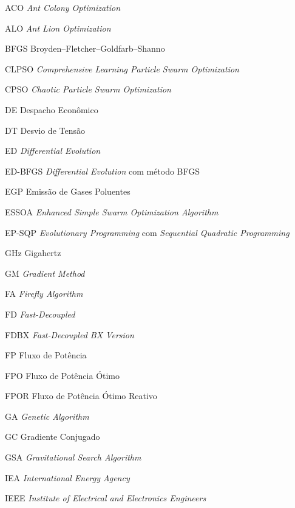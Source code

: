 \documentclass[
	12pt,				%
	openany,			%
	twoside,			%
	a4paper,			%
	chapter=TITLE,		%
	section=Title,		%
	subsection=Title,	%
	subsubsection=Title,%
	english,			%
	french,				%
	spanish,			%
	brazil			%
	]{abntex2}
\newcommand{\listofquadrosname}{Lista de quadros}
\begin{document}
\begin{ERRATA}
\pdfbookmark[0]{\listofquadrosname}{loq}
\listofquadros*
\cleardoublepage

\listoftables*
\cleardoublepage

\begin{siglas}
    \item[ACO] \emph{Ant Colony Optimization}
    \item[ALO] \emph{Ant Lion Optimization}
    \item[BFGS] Broyden–Fletcher–Goldfarb–Shanno
    \item[CLPSO] \emph{Comprehensive Learning Particle Swarm Optimization}
    \item [CPSO] \emph{Chaotic Particle Swarm Optimization}
    \item[DE] Despacho Econômico
    \item[DT] Desvio de Tensão
    \item[ED] \emph{Differential Evolution}
    \item[ED-BFGS] \emph{Differential Evolution} com método BFGS
    \item[EGP] Emissão de Gases Poluentes
    \item[ESSOA] \emph{Enhanced Simple Swarm Optimization Algorithm}
    \item[EP-SQP] \emph{Evolutionary Programming} com \emph{Sequential Quadratic Programming}
    \item[GHz] Gigahertz
    \item[GM] \emph{Gradient Method}
    \item[FA] \emph{Firefly Algorithm}
    \item[FD] \emph{Fast-Decoupled}
    \item[FDBX] \emph{Fast-Decoupled BX Version}
    \item[FP] Fluxo de Potência
    \item[FPO] Fluxo de Potência Ótimo
    \item[FPOR] Fluxo de Potência Ótimo Reativo
    \item[GA] \emph{Genetic Algorithm}
    \item[GC] Gradiente Conjugado
    \item[GSA] \emph{Gravitational Search Algorithm}
  \item[IEA] \emph{International Energy Agency}
    \item[IEEE] \emph{Institute of Electrical and Electronics Engineers}

\end{siglas}
\end{ERRATA}
\end{document}

